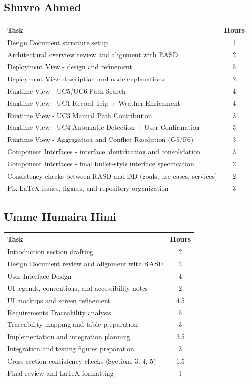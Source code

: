 \subsection{Shuvro Ahmed}

{\centering
\begin{tabular}{@{}p{8cm}c@{}}
	\toprule
	\textbf{Task} & \textbf{Hours} \\
\midrule
Design Document structure setup & 1 \\
Architectural overview review and alignment with RASD & 2 \\
Deployment View - design and refinement & 5 \\
Deployment View description and node explanations & 2 \\
Runtime View - UC5/UC6 Path Search & 4 \\
Runtime View - UC1 Record Trip + Weather Enrichment & 4 \\
Runtime View - UC3 Manual Path Contribution & 3 \\
Runtime View - UC4 Automatic Detection + User Confirmation & 5 \\
Runtime View - Aggregation and Conflict Resolution (G5/F6) & 3 \\
Component Interfaces - interface identification and consolidation & 3 \\
Component Interfaces - final bullet-style interface specification & 2 \\
Consistency checks between RASD and DD (goals, use cases, services) & 2 \\
Fix LaTeX issues, figures, and repository organization & 3 \\
\bottomrule
\end{tabular}\par}


\subsection{Umme Humaira Himi}

{\centering
\begin{tabular}{@{}p{8cm}c@{}}
	\toprule
	\textbf{Task} & \textbf{Hours} \\
\midrule
Introduction section drafting & 2 \\
Design Document review and alignment with RASD & 2 \\
User Interface Design & 4 \\
UI legends, conventions, and accessibility notes & 2 \\
UI mockups and screen refinement & 4.5 \\
Requirements Traceability analysis & 5 \\
Traceability mapping and table preparation & 3 \\
Implementation and integration planning & 3.5 \\
Integration and testing figures preparation & 3 \\
Cross-section consistency checks (Sections 3, 4, 5) & 1.5 \\
Final review and LaTeX formatting & 1 \\
\bottomrule
\end{tabular}\par}


